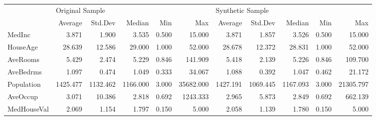\begin{tabular}{lrrrrrrrrrr}
\toprule
{} & \multicolumn{5}{l}{Original Sample} & \multicolumn{5}{l}{Synthetic Sample} \\
{} &         Average &   Std.Dev &    Median &    Min &        Max &          Average &   Std.Dev &    Median &    Min &        Max \\
\midrule
MedInc      &           3.871 &     1.900 &     3.535 &  0.500 &     15.000 &            3.871 &     1.857 &     3.526 &  0.500 &     15.000 \\
HouseAge    &          28.639 &    12.586 &    29.000 &  1.000 &     52.000 &           28.678 &    12.372 &    28.831 &  1.000 &     52.000 \\
AveRooms    &           5.429 &     2.474 &     5.229 &  0.846 &    141.909 &            5.418 &     2.139 &     5.226 &  0.846 &    109.700 \\
AveBedrms   &           1.097 &     0.474 &     1.049 &  0.333 &     34.067 &            1.088 &     0.392 &     1.047 &  0.462 &     21.172 \\
Population  &        1425.477 &  1132.462 &  1166.000 &  3.000 &  35682.000 &         1427.191 &  1069.445 &  1167.093 &  3.000 &  21305.797 \\
AveOccup    &           3.071 &    10.386 &     2.818 &  0.692 &   1243.333 &            2.965 &     5.873 &     2.849 &  0.692 &    662.139 \\
MedHouseVal &           2.069 &     1.154 &     1.797 &  0.150 &      5.000 &            2.058 &     1.139 &     1.780 &  0.150 &      5.000 \\
\bottomrule
\end{tabular}
